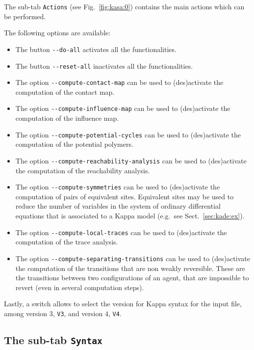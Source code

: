 \documentclass[11pt]{book}
\begin{document}
The sub-tab \texttt{Actions} (see Fig.~\ref{fig:kasa:0}) contains the main actions which can be performed.

The following options are available:
\begin{itemize}
\item The button \texttt{-{}-do-all} activates all the functionalities.
\item The button \texttt{-{}-reset-all} inactivates all the functionalities.
\item The option \texttt{-{}-compute-contact-map} can be used to (des)activate the computation of the contact map.
\item The option \texttt{-{}-compute-influence-map} can be used to (des)activate the computation of the influence map.
\item The option \texttt{-{}-compute-potential-cycles} can be used to (des)activate the computation of the potential polymers.
\item The option \texttt{-{}-compute-reachability-analysis} can be used to (des)activate the computation of the reachability analysis.
\item The option \texttt{-{}-compute-symmetries} can be used to (des)activate the computation of pairs of equivalent sites. Equivalent sites may be used to reduce the number of variables in the system of ordinary differential equations that is associated to a Kappa model (e.g.~see Sect.~\ref{sec:kade:ex}).
\item The option \texttt{-{}-compute-local-traces} can be used to (des)activate the computation of the trace analysis.
\item The option \texttt{-{}-compute-separating-transitions} can be used to (des)activate the computation of the transitions that are non weakly
reversible. These are the transitions between two configurations of an agent, that are impossible to revert (even in several computation steps).
\end{itemize}

Lastly, a switch allows to select the version for Kappa syntax for the input file, among version $3$, \texttt{V3}, and version $4$, \texttt{V4}.

\subsection{The sub-tab \texttt{Syntax}}
\end{document}

